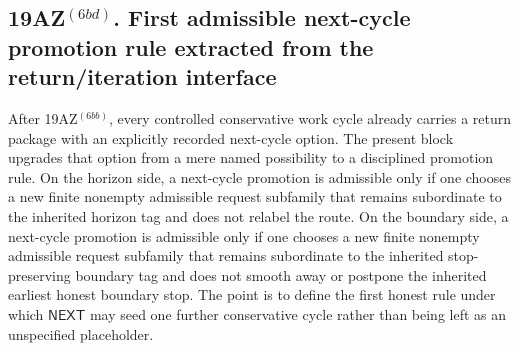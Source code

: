 \subsection*{19AZ$^{(6bd)}$. First admissible next-cycle promotion rule extracted from the return/iteration interface}
\label{sec:first-admissible-next-cycle-promotion-rule-extracted-from-the-return-iteration-interface}
After 19AZ$^{(6bb)}$, every controlled conservative work cycle already carries a return package with an explicitly recorded next-cycle option. The present block upgrades that option from a mere named possibility to a disciplined promotion rule. On the horizon side, a next-cycle promotion is admissible only if one chooses a new finite nonempty admissible request subfamily that remains subordinate to the inherited horizon tag and does not relabel the route. On the boundary side, a next-cycle promotion is admissible only if one chooses a new finite nonempty admissible request subfamily that remains subordinate to the inherited stop-preserving boundary tag and does not smooth away or postpone the inherited earliest honest boundary stop. The point is to define the first honest rule under which \(\mathsf{NEXT}\) may seed one further conservative cycle rather than being left as an unspecified placeholder.


